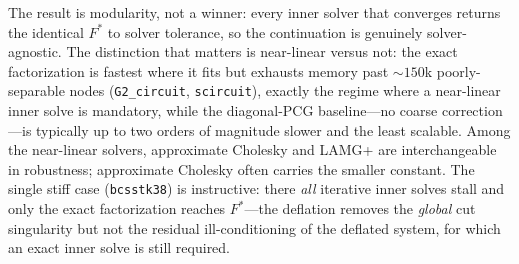 \documentclass{siamart220329}
\begin{document}
The result is modularity, not a winner: every inner solver that converges returns the identical
$F^*$ to solver tolerance, so the continuation is genuinely solver-agnostic. The distinction that
matters is near-linear versus not: the exact factorization is fastest where it fits but exhausts
memory past ${\sim}150$k poorly-separable nodes (\texttt{G2\_circuit}, \texttt{scircuit}), exactly the
regime where a near-linear inner solve is mandatory, while the diagonal-PCG baseline---no coarse
correction---is typically up to two orders of magnitude slower and the least scalable. Among the
near-linear solvers, approximate Cholesky and LAMG+ are interchangeable in robustness; approximate
Cholesky often carries the smaller constant. The single
stiff case (\texttt{bcsstk38}) is instructive: there \emph{all} iterative inner solves stall and only
the exact factorization reaches $F^*$---the deflation removes the \emph{global} cut singularity but not the residual ill-conditioning of the deflated system, for which an exact inner solve is still required.

\begin{table}[t]\centering\small
\caption{Inner-solver swap inside NLF's max-flow continuation to $F^*$ (wall-clock seconds; ``stall''
$=$ did not converge within $120$ steps; ``OOM'' $=$ exact factorization size-guarded at $150$k
nodes). Every converging solver returns the \emph{identical} $F^*$, so the continuation is
solver-agnostic; the operative choice is near-linear versus not. Representative subset; the bake-off
script and its outputs are in the released artifact. On \texttt{bcsstk38} the stalled iterative solvers were arrested at
$37.0$, far from the true $F^*\!=\!45.6$ the direct solve reaches.}\label{tab:innerfold}
\end{table}
\end{document}
